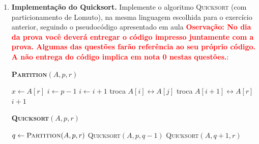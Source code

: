 \documentclass[9pt,a4paper]{extarticle}
\begin{document}
\begin{enumerate}[resume]
    \item \textbf{Implementação do Quicksort.} Implemente o algoritmo \textsc{Quicksort} (com particionamento de Lomuto), na mesma linguagem escolhida para o exercício anterior, seguindo o pseudocódigo apresentado em aula \textbf{\textcolor{red}{Oservação: No dia da prova você deverá entregar o código impresso juntamente com a prova. Algumas das questões farão referência ao seu próprio código. A não entrega do código implica em nota 0 nestas questões.}}:

    \begin{center}
    \begin{minipage}{0.7\textwidth}
    \textbf{\textsc{Partition}}$(A, p, r)$
    \begin{algorithmic}[1]
        \State $x \gets A[r]$
        \State $i \gets p - 1$
                \State $i \gets i + 1$
                \State troca $A[i] \leftrightarrow A[j]$
            \EndIf
        \EndFor
        \State troca $A[i+1] \leftrightarrow A[r]$
        \State \Return $i + 1$
    \end{algorithmic}
    \end{minipage}
    \end{center}

    \begin{center}
    \begin{minipage}{0.7\textwidth}
    \textbf{\textsc{Quicksort}}$(A, p, r)$
    \begin{algorithmic}[1]
            \State $q \gets \textsc{Partition}(A, p, r)$
            \State \textsc{Quicksort}$(A, p, q - 1)$
            \State \textsc{Quicksort}$(A, q + 1, r)$
        \EndIf
    \end{algorithmic}
    \end{minipage}
    \end{center}


\end{enumerate}
\end{document}

